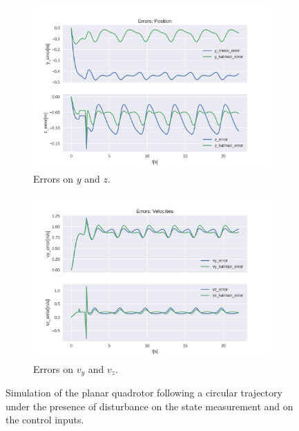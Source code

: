 \documentclass{thesisreport}
\begin{document}
\begin{figure}[H]
\medskip
	\begin{subfigure}{0.48\textwidth}
		\includegraphics[width=\linewidth]{Images/acados_simulations/circular_trajectory/planar_quadrotor/noisy/Errors_position.png}
		\caption{Errors on $y$ and $z$.} \label{fig:planar_sim_error_pose_noisy}
	\end{subfigure}\hspace*{\fill}
	\begin{subfigure}{0.48\textwidth}
		\includegraphics[width=\linewidth]{Images/acados_simulations/circular_trajectory/planar_quadrotor/noisy/Errors_velocities.png}
		\caption{Errors on $v_y$ and $v_z$.} \label{fig:planar_sim_error_velocities_noisy}
	\end{subfigure}

	\caption{Simulation of the planar quadrotor following a circular trajectory under the presence of disturbance on the state measurement and on the control inputs.} \label{fig:planar_sim_noisy}
\end{figure}
\end{document}
